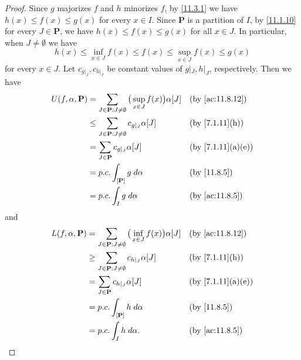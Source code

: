 \begin{proof}
  Since \(g\) majorizes \(f\) and \(h\) minorizes \(f\), by \cref{11.3.1} we have \(h(x) \leq f(x) \leq g(x)\) for every \(x \in I\).
  Since \(\mathbf{P}\) is a partition of \(I\), by \cref{11.1.10} for every \(J \in \mathbf{P}\), we have \(h(x) \leq f(x) \leq g(x)\) for all \(x \in J\).
  In particular, when \(J \neq \emptyset\) we have
  \[
    h(x) \leq \inf_{x \in J} f(x) \leq f(x) \leq \sup_{x \in J} f(x) \leq g(x)
  \]
  for every \(x \in J\).
  Let \(c_{g|_J}, c_{h|_J}\) be constant values of \(g|_J, h|_J\), respectively.
  Then we have
  \begin{align*}
    U(f, \alpha, \mathbf{P}) & = \sum_{J \in \mathbf{P} : J \neq \emptyset} \big(\sup_{x \in J} f(x)\big) \alpha[J] &  & \text{(by \cref{ac:11.8.12})}   \\
                             & \leq \sum_{J \in \mathbf{P} : J \neq \emptyset} c_{g|_J} \alpha[J]                   &  & \text{(by \cref{7.1.11}(h))}    \\
                             & = \sum_{J \in \mathbf{P}} c_{g|_J} \alpha[J]                                         &  & \text{(by \cref{7.1.11}(a)(e))} \\
                             & = p.c. \int_{[\mathbf{P}]} g \; d \alpha                                             &  & \text{(by \cref{11.8.5})}       \\
                             & = p.c. \int_I g \; d \alpha                                                          &  & \text{(by \cref{ac:11.8.5})}
  \end{align*}
  and
  \begin{align*}
    L(f, \alpha, \mathbf{P}) & = \sum_{J \in \mathbf{P} : J \neq \emptyset} \big(\inf_{x \in J} f(x)\big) \alpha[J] &  & \text{(by \cref{ac:11.8.12})}   \\
                             & \geq \sum_{J \in \mathbf{P} : J \neq \emptyset} c_{h|_J} \alpha[J]                   &  & \text{(by \cref{7.1.11}(h))}    \\
                             & = \sum_{J \in \mathbf{P}} c_{h|_J} \alpha[J]                                         &  & \text{(by \cref{7.1.11}(a)(e))} \\
                             & = p.c. \int_{[\mathbf{P}]} h \; d \alpha                                             &  & \text{(by \cref{11.8.5})}       \\
                             & = p.c. \int_I h \; d \alpha.                                                         &  & \text{(by \cref{ac:11.8.5})}
  \end{align*}
\end{proof}

